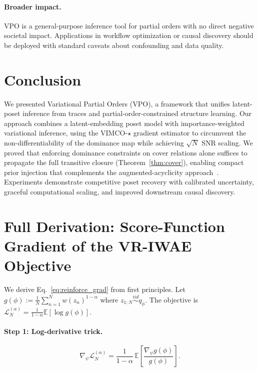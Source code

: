 \documentclass{article}
\theoremstyle{definition}
\theoremstyle{remark}
\newcommand{\E}{\mathbb{E}}
\providecommand{\coloneqq}{:=}
\begin{document}
\paragraph{Broader impact.}
VPO is a general-purpose inference tool for partial orders with no
direct negative societal impact.
Applications in workflow optimization or causal discovery should be
deployed with standard caveats about confounding and data quality.

\section{Conclusion}
\label{sec:conclusion}

We presented Variational Partial Orders (VPO), a framework that unifies
latent-poset inference from traces and partial-order-constrained structure
learning.
Our approach combines a latent-embedding poset model with
importance-weighted variational inference, using the VIMCO-$\star$ gradient
estimator to circumvent the non-differentiability of the dominance map
while achieving $\sqrt{N}$ SNR scaling.
We proved that enforcing dominance constraints on cover relations alone
suffices to propagate the full transitive closure
(Theorem~\ref{thm:cover}), enabling compact prior injection that
complements the augmented-acyclicity
approach~\citep{ban2024differentiable}.
Experiments demonstrate competitive poset recovery with calibrated
uncertainty, graceful computational scaling, and improved downstream
causal discovery.




\newpage
\appendix

\section{Full Derivation: Score-Function Gradient of the VR-IWAE Objective}
\label{app:sf_derivation}

We derive Eq.~\eqref{eq:reinforce_grad} from first principles.
Let $g(\phi)\coloneqq\frac{1}{N}\sum_{n=1}^N w(z_n)^{1-\alpha}$ where
$z_{1:N}\stackrel{iid}{\sim}q_\phi$.
The objective is
$\mathcal{L}^{(\alpha)}_N=\frac{1}{1-\alpha}\E[\log g(\phi)]$.

\paragraph{Step 1: Log-derivative trick.}
\begin{equation}
\nabla_\psi\mathcal{L}^{(\alpha)}_N
= \frac{1}{1-\alpha}\,\E\!\left[\frac{\nabla_\psi g(\phi)}{g(\phi)}\right].
\end{equation}
\end{document}
